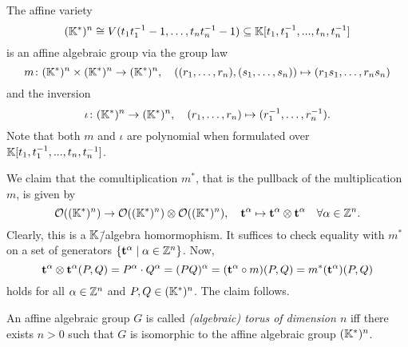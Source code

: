 \begin{ex}
	\label{example:algebraic_torus}
	The affine variety $$(\mathbb{K}^*)^n \cong V(t_1t_1^{-1} - 1,\dots, t_nt_n^{-1}-1)\subseteq\mathbb{K}[t_1,t_1^{-1},...,t_n,t_n^{-1}]$$
	is an affine algebraic group via the group law
	$$m\colon (\mathbb{K}^*)^n \times (\mathbb{K}^*)^n \rightarrow (\mathbb{K}^*)^n,\quad ((r_1,\dots,r_n),(s_1,\dots,s_n)) \mapsto (r_1s_1,\dots,r_ns_n)$$
	and the inversion
	$$\iota\colon(\mathbb{K}^*)^n \rightarrow (\mathbb{K}^*)^n,\quad (r_1,\dots,r_n) \mapsto (r_1^{-1},\dots,r_n^{-1}).$$
	Note that both $m$ and $\iota$ are polynomial when formulated over $\mathbb{K}[t_1,t_1^{-1},...,t_n,t_n^{-1}]$.
	
	We claim that the comultiplication $m^*$, that is the pullback of the multiplication $m$, is given by
	$$\mathcal{O}((\mathbb{K}^*)^n) \rightarrow \mathcal{O}((\mathbb{K}^*)^n) \otimes \mathcal{O}((\mathbb{K}^*)^n),\quad \mathbf{t}^\alpha \mapsto \mathbf{t}^\alpha \otimes \mathbf{t}^\alpha\quad \forall \alpha\in\mathbb{Z}^n.$$
	Clearly, this is a $\mathbb{K}$\=/algebra homormophism. It suffices to check equality with $m^*$ on a set of generators $\{\mathbf{t}^\alpha\mid \alpha\in\mathbb{Z}^n\}$. Now, 
	$$\mathbf{t}^\alpha \otimes \mathbf{t}^\alpha (P, Q) = P^\alpha\cdot Q^\alpha = (PQ)^\alpha =  (\mathbf{t}^\alpha \circ m) (P,Q) = m^*(\mathbf{t}^\alpha) (P,Q)$$ holds for all $\alpha\in\mathbb{Z}^n$ and $P,Q\in(\mathbb{K}^*)^n$. The claim follows.
\end{ex}

\begin{defi}
	An affine algebraic group $G$ is called \emph{(algebraic) torus of dimension $n$} iff there exists $n>0$ such that $G$ is isomorphic to the affine algebraic group $(\mathbb{K}^*)^n$.
\end{defi}


